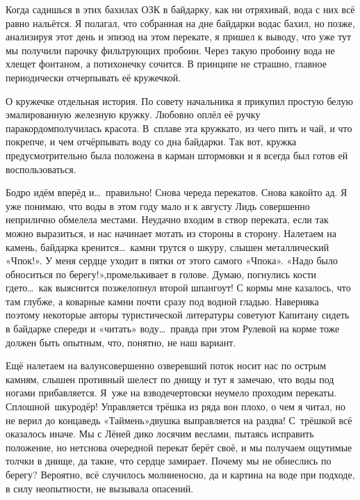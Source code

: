 Когда садишься в этих бахилах ОЗК в байдарку, как ни отряхивай, вода с них всё равно нальётся. Я полагал, что собранная на дне байдарки вода\mdash с бахил, но позже, анализируя этот день и эпизод на этом перекате, я пришел к выводу, что уже тут мы получили парочку фильтрующих пробоин. Через такую пробоину вода не хлещет фонтаном, а потихонечку сочится. В принципе не страшно, главное периодически отчерпывать её кружечкой.

О кружечке отдельная история. По совету начальника я прикупил простую белую эмалированную железную кружку. Любовно оплёл её ручку паракордом\mdash получилась красота. В~сплаве эта кружка\mdash то, из чего пить и чай, и что покрепче, и чем отчёрпывать воду со дна байдарки. Так вот, кружка предусмотрительно была положена в карман штормовки и я всегда был готов ей воспользоваться.

Бодро идём вперёд и\ldots~правильно! Снова череда перекатов. Снова какой\sdash то ад. Я уже понимаю, что воды в этом году мало и к августу Лидь совершенно неприлично обмелела местами. Неудачно входим в створ переката, если так можно выразиться, и нас начинает мотать из стороны в сторону. Налетаем на камень, байдарка кренится\ldots~камни трутся о шкуру, слышен металлический «Чпок!». У меня сердце уходит в пятки от этого самого «Чпока». «Надо было обноситься по берегу!»,\mdash промелькивает в голове. Думаю, погнулись кости где\sdash то\ldots~как выяснится позже\mdash лопнул второй шпангоут! С кормы мне казалось, что там глубже, а коварные камни почти сразу под водной гладью. Наверняка поэтому некоторые авторы туристической литературы советуют Капитану сидеть в байдарке спереди и «читать» воду\ldots~правда при этом Рулевой на корме тоже должен быть опытным, что, понятно, не наш вариант.

Ещё налетаем на валун\mdash совершенно озверевший поток носит нас по острым камням, слышен противный шелест по днищу и тут я замечаю, что воды под ногами прибавляется. Я~уже на взводе\mdash чертовски неумело проходим перекаты. Сплошной~шкуродёр! Управляется трёшка из ряда вон плохо, о чем я читал, но не верил до конца\mdash ведь «Таймень»\sdash двушка выправляется на раз\sdash два! С~трёшкой всё оказалось иначе. Мы с Лёней дико лосячим веслами, пытаясь исправить положение, но нет\mdash снова очередной перекат берёт своё, и мы получаем ощутимые толчки в днище, да такие, что сердце замирает. Почему мы не обнеслись по берегу? Вероятно, всё случилось молниеносно, да и картина на воде при подходе, в силу неопытности, не вызывала опасений.

